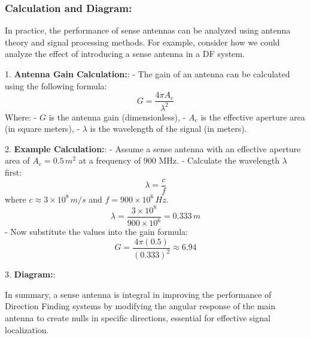 \subsubsection*{Calculation and Diagram:}

In practice, the performance of sense antennas can be analyzed using antenna theory and signal processing methods. For example, consider how we could analyze the effect of introducing a sense antenna in a DF system.

1. \textbf{Antenna Gain Calculation:}:
    - The gain of an antenna can be calculated using the following formula:
    \[
    G = \frac{4 \pi A_e}{\lambda^2}
    \]
    Where:
    - \(G\) is the antenna gain (dimensionless),
    - \(A_e\) is the effective aperture area (in square meters),
    - \(\lambda\) is the wavelength of the signal (in meters).

2. \textbf{Example Calculation:}:
    - Assume a sense antenna with an effective aperture area of \(A_e = 0.5 \, m^2\) at a frequency of 900 MHz.
    - Calculate the wavelength \(\lambda\) first:
    \[
    \lambda = \frac{c}{f}
    \]
    where \(c \approx 3 \times 10^8 \, m/s\) and \(f = 900 \times 10^6 \, Hz\).
    \[
    \lambda = \frac{3 \times 10^8}{900 \times 10^6} = 0.333 \, m
    \]
    - Now substitute the values into the gain formula:
    \[
    G = \frac{4 \pi (0.5)}{(0.333)^2} \approx 6.94
    \]

3. \textbf{Diagram:}:

In summary, a sense antenna is integral in improving the performance of Direction Finding systems by modifying the angular response of the main antenna to create nulls in specific directions, essential for effective signal localization.
